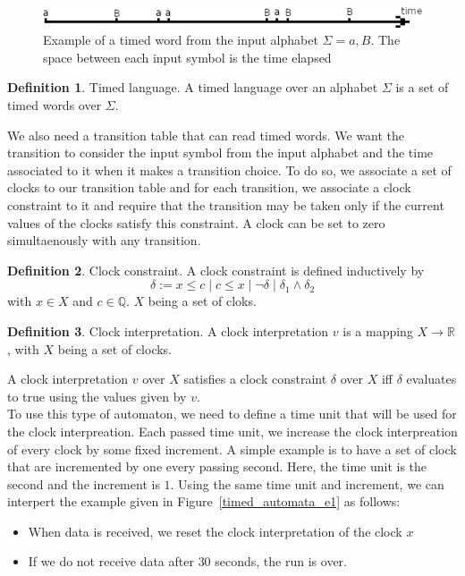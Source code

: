 \documentclass[12pt]{article}
\theoremstyle{definition}
\newtheorem{definition}{Definition}[section]
\theoremstyle{definition}
\theoremstyle{remark}
\newcommand{\R}{\mathbb{R}}
\newcommand{\Q}{\mathbb{Q}}
\begin{document}
\begin{figure}
    \centering
    \includegraphics[scale=3]{timed_word.png}
    \caption{Example of a timed word from the input alphabet $\Sigma = {a, B}$. The space between each input symbol is the time elapsed}
    \label{timed_word}
\end{figure}

\theoremstyle{definition}
\begin{definition}{Timed language.}
A timed language over an alphabet $\Sigma$ is a set of timed words over $\Sigma$.
\end{definition}

We also need a transition table that can read timed words. We want the transition to consider the input symbol from the input alphabet and the time associated to it when it makes a transition choice. To do so, we associate a set of clocks to our transition table and for each transition, we associate a clock constraint to it and require that the transition may be taken only if the current values of the clocks satisfy this constraint. A clock can be set to zero simultaenously with any transition.

\theoremstyle{definition}
\begin{definition}{Clock constraint.} A clock constraint is defined inductively by
$$\delta := x \le c \mid c \le x \mid \neg \delta \mid \delta_1 \land \delta_2$$ with $x \in X$ and $c \in \Q$. $X$ being a set of cloks.
\end{definition}

\theoremstyle{definition}
\begin{definition}{Clock interpretation.} A clock interpretation $v$ is a mapping $X \to \R$, with $X$ being a set of clocks.
\end{definition}

A clock interpretation $v$ over $X$ satisfies a clock constraint $\delta$ over $X$ iff $\delta$ evaluates to true using the values given by $v$.\\

To use this type of automaton, we need to define a time unit that will be used for the clock interpreation. Each passed time unit, we increase the clock interpreation of every clock by some fixed increment. A simple example is to have a set of clock that are incremented by one every passing second. Here, the time unit is the second and the increment is $1$. Using the same time unit and increment, we can interpert the example given in Figure~\ref{timed_automata_e1} as follows:
\begin{itemize}
\item When data is received, we reset the clock interpretation of the clock $x$
\item If we do not receive data after $30$ seconds, the run is over.
\end{itemize}
\end{document}
